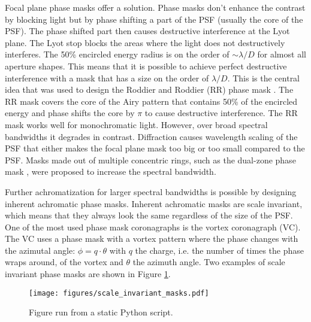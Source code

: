 \documentclass[letterpaper]{ar-1col}
\begin{document}
Focal plane phase masks offer a solution. Phase masks don't enhance the contrast by blocking light but by phase shifting a part of the PSF (usually the core of the PSF). The phase shifted part then causes destructive interference at the Lyot plane. The Lyot stop blocks the areas where the light does not destructively interferes. The 50\% encircled energy radius is on the order of $\sim \lambda/D$ for almost all aperture shapes. This means that it is possible to achieve perfect destructive interference with a mask that has a size on the order of $\lambda/D$. This is the central idea that was used to design the Roddier and Roddier (RR) phase mask \cite{roddier1997stellar}. The RR mask covers the core of the Airy pattern that contains 50\% of the encircled energy and phase shifts the core by $\pi$ to cause destructive interference. The RR mask works well for monochromatic light. However, over broad spectral bandwidths it degrades in contrast. Diffraction causes wavelength scaling of the PSF that either makes the focal plane mask too big or too small compared to the PSF. Masks made out of multiple concentric rings, such as the dual-zone phase mask \cite{soummer2003achromatic}, were proposed to increase the spectral bandwidth.

Further achromatization for larger spectral bandwidths is possible by designing inherent achromatic phase masks. Inherent achromatic masks are scale invariant, which means that they always look the same regardless of the size of the PSF. One of the most used phase mask coronagraphs is the vortex coronagraph (VC). The VC uses a phase mask with a vortex pattern where the phase changes with the azimutal angle: $\phi=q \cdot \theta$ with $q$ the charge, i.e. the number of times the phase wraps around, of the vortex and $\theta$ the azimuth angle. Two examples of scale invariant phase masks are shown in Figure \ref{fig:scale_invariant}.

\begin{figure}[ht]
  \centering
  \texttt{[image: figures/scale\_invariant\_masks.pdf]}
  \caption{Figure run from a static Python script.}
  \label{fig:scale_invariant}
\end{figure}


%
\end{document}

